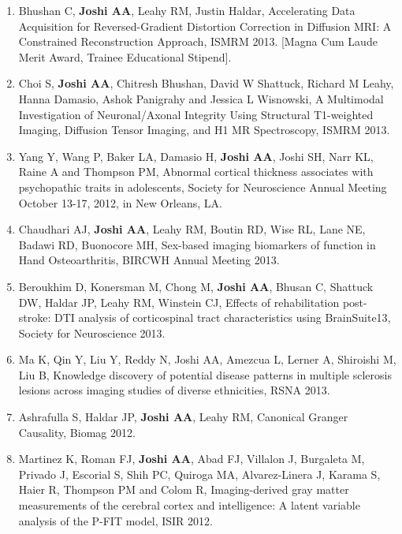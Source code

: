 \documentclass[overlapped,line,letterpaper]{res}
\begin{document}
\begin{resume}
\begin{enumerate}
    \item Bhushan C, \textbf{Joshi AA}, Leahy RM, Justin Haldar, Accelerating Data Acquisition for Reversed-Gradient Distortion Correction in Diffusion MRI: A Constrained Reconstruction Approach, ISMRM 2013. [Magna Cum Laude Merit Award, Trainee Educational Stipend].

    \item Choi S, \textbf{Joshi AA}, Chitresh Bhushan, David W Shattuck, Richard M Leahy, Hanna Damasio, Ashok Panigrahy and Jessica L Wisnowski, A Multimodal Investigation of Neuronal/Axonal Integrity Using Structural T1-weighted Imaging, Diffusion Tensor Imaging, and H1 MR Spectroscopy, ISMRM 2013.

    \item Yang Y, Wang P, Baker LA, Damasio H, \textbf{Joshi AA}, Joshi SH, Narr KL, Raine A and Thompson PM, {Abnormal cortical thickness associates with psychopathic traits in adolescents}, Society for Neuroscience Annual Meeting October 13-17, 2012, in New Orleans, LA.

    \item Chaudhari AJ, \textbf{Joshi AA}, Leahy RM, Boutin RD, Wise RL, Lane NE, Badawi RD, Buonocore MH, {Sex-based imaging biomarkers of function in Hand Osteoarthritis}, BIRCWH Annual Meeting 2013.

    \item Beroukhim D, Konersman M, Chong M, \textbf{Joshi AA}, Bhusan C, Shattuck DW, Haldar JP, Leahy RM, Winstein CJ, {Effects of rehabilitation post-stroke: DTI analysis of corticospinal tract characteristics using BrainSuite13}, Society for Neuroscience 2013.

    \item Ma K, Qin Y, Liu Y, Reddy N, {Joshi AA}, Amezcua L, Lerner A, Shiroishi M, Liu B, {Knowledge discovery of potential disease patterns in multiple sclerosis lesions across imaging studies of diverse ethnicities}, RSNA 2013.

    \item Ashrafulla S, Haldar JP, \textbf{Joshi AA}, Leahy RM, {Canonical Granger Causality}, Biomag 2012.

    \item Martinez K, Roman FJ, \textbf{Joshi AA}, Abad FJ, Villalon J, Burgaleta M, Privado J, Escorial S, Shih PC, Quiroga MA, Alvarez-Linera J, Karama S, Haier R, Thompson PM and Colom R, {Imaging-derived gray matter measurements of the cerebral cortex and intelligence: A latent variable analysis of the P-FIT model}, ISIR 2012.


\end{enumerate}
\end{resume}
\end{document}
